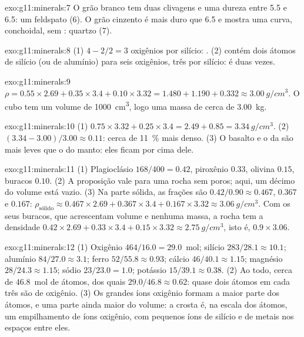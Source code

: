 \begin{solution}{exo:g11:minerals:7}
O grão branco tem duas clivagens e uma dureza entre 5.5 e 6.5: um feldspato
(6). O grão cinzento é mais duro que 6.5 e mostra uma  curva,
conchoidal, sem : quartzo (7).
\end{solution}

\begin{solution}{exo:g11:minerals:8}
(1) $4 - 2/2 = 3$ oxigênios por silício: . (2) 
contém dois átomos de silício (ou de alumínio) para seis oxigênios, três por
silício: é  duas vezes.
\end{solution}

\begin{solution}{exo:g11:minerals:9}
$\rho = 0.55 \times 2.69 + 0.35 \times 3.4 + 0.10 \times 3.32 = 1.480 + 1.190
+ 0.332 \approx \qty{3.00}{g/cm^3}$. O cubo tem um volume de
\qty{1000}{cm^3}, logo uma massa de cerca de \qty{3.00}{kg}.
\end{solution}

\begin{solution}{exo:g11:minerals:10}
(1) $0.75 \times 3.32 + 0.25 \times 3.4 = 2.49 + 0.85 = \qty{3.34}{g/cm^3}$.
(2) $(3.34 - 3.00)/3.00 \approx 0.11$: cerca de \qty{11}{\percent} mais
denso. (3) O basalto e o  da  são mais leves que o
 do manto: eles ficam por cima dele.
\end{solution}

\begin{solution}{exo:g11:minerals:11}
(1) Plagioclásio $168/400 = 0.42$, piroxênio $0.33$, olivina $0.15$, buracos
$0.10$. (2) A proposição vale para uma rocha sem poros; aqui, um décimo do
volume está vazio. (3) Na parte sólida, as frações são $0.42/0.90
\approx 0.467$, $0.367$ e $0.167$:
$\rho_{\text{sólido}} \approx 0.467 \times 2.69 + 0.367 \times 3.4 + 0.167
\times 3.32 \approx \qty{3.06}{g/cm^3}$. Com os seus buracos, que
acrescentam volume e nenhuma massa, a rocha tem a densidade $0.42 \times 2.69 + 0.33 \times 3.4 +
0.15 \times 3.32 \approx \qty{2.75}{g/cm^3}$, isto é, $0.9 \times 3.06$.
\end{solution}

\begin{solution}{exo:g11:minerals:12}
(1) Oxigênio $464/16.0 = 29.0$~mol; silício $283/28.1 \approx 10.1$; alumínio
$84/27.0 \approx 3.1$; ferro $52/55.8 \approx 0.93$; cálcio $46/40.1 \approx
1.15$; magnésio $28/24.3 \approx 1.15$; sódio $23/23.0 = 1.0$; potássio
$15/39.1 \approx 0.38$. (2) Ao todo, cerca de $46.8$~mol de átomos, dos quais
$29.0/46.8 \approx 0.62$: quase dois átomos em cada três são de oxigênio.
(3) Os grandes íons oxigênio formam a maior parte dos átomos, e uma parte
ainda maior do volume: a crosta é, na escala dos átomos, um empilhamento de
íons oxigênio, com pequenos íons de silício e de metais nos espaços entre
eles.
\end{solution}

